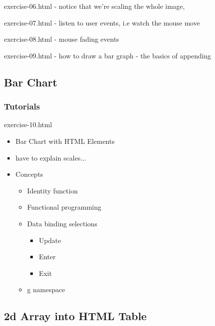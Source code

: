 \documentclass{beamer}
\begin{document}
\begin{frame}
exercise-06.html
- notice that we're scaling the whole image, 

exercise-07.html
- listen to user events, i.e watch the mouse move

exercise-08.html
- mouse fading events

exercise-09.html
- how to draw a bar graph
- the basics of appending 

\subsection{Bar Chart}

\begin{frame}
    \frametitle{Tutorials}
    \begin{block}{exercise-10.html}
        \begin{itemize}
            \pause
            \item Bar Chart with HTML Elements
            \pause
            \item have to explain scales... 

            \item Concepts
            \begin{itemize}
                \pause
                \item Identity function
                \pause
                \item Functional programming
                \pause
                \item Data binding selections
                \begin{itemize}
                    \pause
                    \item Update
                    \pause
                    \item Enter
                    \pause
                    \item Exit
                \end{itemize}
                \pause
                \item g namespace
            \end{itemize}
        \end{itemize}
    \end{block}
\end{frame}


\subsection{2d Array into HTML Table}


\end{frame}
\end{document}
